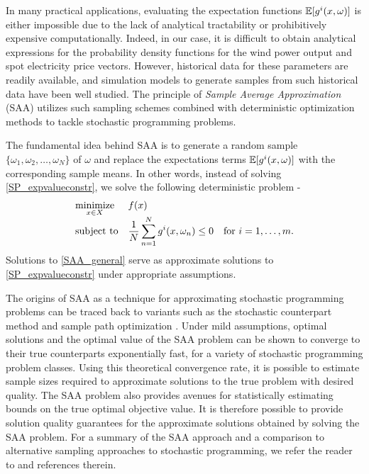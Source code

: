 In many practical applications, evaluating the expectation functions $\mathbb{E}[g^i(x,
\omega)]$ is either impossible due to the lack of analytical tractability or
prohibitively expensive computationally. Indeed, in our case, it is difficult to
obtain analytical expressions for the probability density functions for the wind
power output and spot electricity price vectors. However, historical data for
these parameters are readily available, and simulation models to generate
samples from such historical data have been well studied. The principle of
\emph{Sample Average Approximation} (SAA) utilizes such sampling schemes
combined with deterministic optimization methods to tackle stochastic
programming problems.

The fundamental idea behind SAA is to generate a random sample $\{\omega_1,
\omega_2, \ldots, \omega_N \}$ of $\omega$ and replace the expectations terms
$\mathbb{E} [g^i(x,\omega)]$ with the corresponding sample means. In other words,
instead of solving \eqref{SP_expvalueconstr}, we solve the following
deterministic problem -
\begin{equation} \label{SAA_general}
\begin{array}{ll}
\displaystyle\mathop{\hbox{\rm minimize}}_{x \in X} & f(x) \\
\mathrm{subject\ to} & \displaystyle  \frac{1}{N} \sum_{n=1}^N g^i(x,\omega_n) \leq 0 \quad \text{for } i
= 1, \ldots, m.
\end{array}
\end{equation}
Solutions to \eqref{SAA_general} serve as approximate solutions to
\eqref{SP_expvalueconstr} under appropriate assumptions. 

The origins of SAA as a technique for approximating stochastic programming
problems can be traced back to variants such as the stochastic counterpart
method \citep{rubinstein1993discrete} and sample path optimization
\citep{robinson1996analysis,plambeck1996sample,healy1991retrospective}. Under
mild assumptions, optimal solutions and the optimal value of the SAA problem can
be shown to converge to their true counterparts exponentially fast, for a
variety of stochastic programming problem classes. Using this theoretical
convergence rate, it is possible to estimate sample sizes required to
approximate solutions to the true problem with desired quality. The SAA problem
also provides avenues for statistically estimating bounds on the true optimal
objective value. It is therefore possible to provide solution quality guarantees
for the approximate solutions obtained by solving the SAA problem. For a summary
of the SAA approach and a comparison to alternative sampling approaches to
stochastic programming, we refer the reader to
\cite{shapiro_lectures_2009,Kim11aguide} and references therein.

